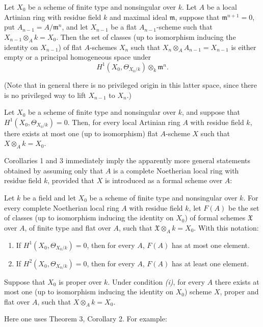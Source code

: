  Let $X_0$ be a scheme of finite type and nonsingular
over $k$. Let $A$ be a local Artinian ring with residue field $k$ and maximal
ideal $\mathfrak m$, suppose that $\mathfrak m^{n+1}=0$, put
$A_{n-1}=A/\mathfrak m^n$, and let $X_{n-1}$ be a flat $A_{n-1}$-scheme such
that $X_{n-1}\otimes_A k=X_0$. Then the set of classes (up to isomorphism
inducing the identity on $X_{n-1}$) of flat $A$-schemes $X_n$ such that
$X_n\otimes_A A_{n-1}=X_{n-1}$ is either empty or a principal homogeneous
space under
\[
  H^1(X_0,\Theta_{X_0/k})\otimes_k\mathfrak m^n.
\]

(Note that in general there is no privileged origin in this latter space,
since there is no privileged way to lift $X_{n-1}$ to $X_n$.)

 Let $X_0$ be a scheme of finite type and nonsingular
over $k$, and suppose that $H^1(X_0,\Theta_{X_0/k})=0$. Then, for every local
Artinian ring $A$ with residue field $k$, there exists at most one (up to
isomorphism) flat $A$-scheme $X$ such that $X\otimes_A k=X_0$.

Corollaries 1 and 3 immediately imply the apparently more general statements
obtained by assuming only that $A$ is a complete Noetherian local ring with
residue field $k$, provided that $X$ is introduced as a formal scheme over
$A$:

 Let $k$ be a field and let $X_0$ be a scheme of finite
type and nonsingular over $k$. For every complete Noetherian local ring $A$
with residue field $k$, let $F(A)$ be the set of classes (up to isomorphism
inducing the identity on $X_0$) of formal schemes $\mathfrak X$ over $A$, of
finite type and flat over $A$, such that $\mathfrak X\otimes_A k=X_0$. With
this notation:
\begin{enumerate}
  \item[\textit{i.}] If $H^1(X_0,\Theta_{X_0/k})=0$, then for every $A$,
    $F(A)$ has at most one element.
  \item[\textit{ii.}] If $H^2(X_0,\Theta_{X_0/k})=0$, then for every $A$,
    $F(A)$ has at least one element.
\end{enumerate}

 Suppose that $X_0$ is proper over $k$. Under condition
\textit{(i)}, for every $A$ there exists at most one (up to isomorphism
inducing the identity on $X_0$) scheme $X$, proper and flat over $A$, such that
$X\otimes_A k=X_0$.

Here one uses Theorem 3, Corollary 2. For example:

